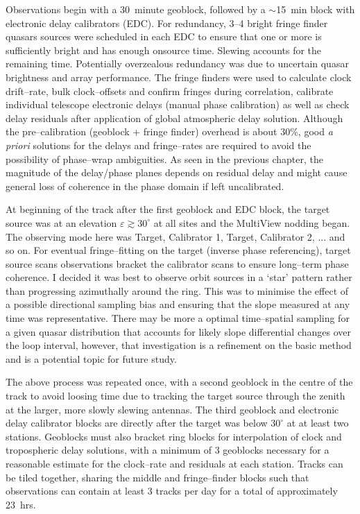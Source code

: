 		Observations begin with a 30~minute geoblock, followed by a $\sim$15~min block with electronic delay calibrators (EDC). For redundancy, 3--4 bright fringe finder quasars sources were scheduled in each EDC to ensure that one or more is sufficiently bright and has enough onsource time. Slewing accounts for the remaining time. Potentially overzealous redundancy was due to uncertain quasar brightness and array performance. The fringe finders were used to calculate clock drift--rate, bulk clock--offsets and confirm fringes during correlation, calibrate individual telescope electronic delays (manual phase calibration) as well as check delay residuals after application of global atmospheric delay solution. Although the pre--calibration (geoblock + fringe finder) overhead is about 30\%, good {\it a priori} solutions for the delays and fringe--rates are required to avoid the possibility of phase--wrap ambiguities. As seen in the previous chapter, the magnitude of the delay/phase planes depends on residual delay and might cause general loss of coherence in the phase domain if left uncalibrated.
		
		At beginning of the track after the first geoblock and EDC block, the target source was at an elevation $\varepsilon\gtrsim30^{\circ}$ at all sites and the MultiView nodding began. The observing mode here was Target, Calibrator 1, Target, Calibrator 2, ... and so on. For eventual fringe--fitting on the target (inverse phase referencing), target source scans observations bracket the calibrator scans to ensure long--term phase coherence. I decided it was best to observe orbit sources in a `star' pattern rather than progressing azimuthally around the ring. This was to minimise the effect of a possible directional sampling bias and ensuring that the slope measured at any time was representative. There may be more a optimal time--spatial sampling for a given quasar distribution that accounts for likely slope differential changes over the loop interval, however, that investigation is a refinement on the basic method and is a potential topic for future study.
				
		The above process was repeated once, with a second geoblock in the centre of the track to avoid loosing time due to tracking the target source through the zenith at the larger, more slowly slewing antennas. The third geoblock and electronic delay calibrator blocks are directly after the target was below $30^{\circ}$ at at least two stations. Geoblocks must also bracket ring blocks for interpolation of clock and tropospheric delay solutions, with a minimum of 3 geoblocks necessary for a reasonable estimate for the clock--rate and residuals at each station. Tracks can be tiled together, sharing the middle and fringe--finder blocks such that observations can contain at least 3 tracks per day for a total of approximately 23~hrs. 

